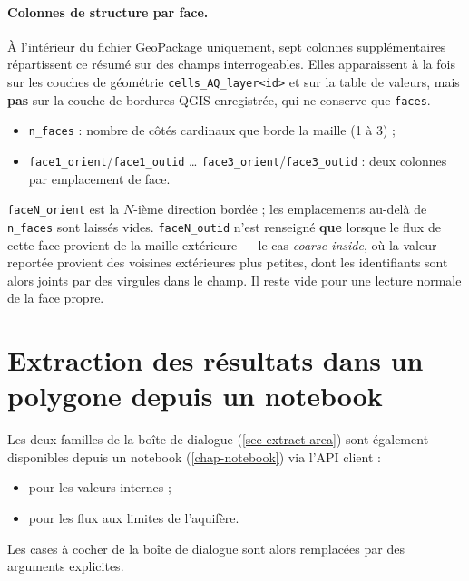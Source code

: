 \paragraph{Colonnes de structure par face.} À l'intérieur du fichier GeoPackage uniquement, sept colonnes supplémentaires répartissent ce résumé sur des champs interrogeables. Elles apparaissent à la fois sur les couches de géométrie \texttt{cells\_AQ\_layer<id>} et sur la table de valeurs, mais \textbf{pas} sur la couche de bordures QGIS enregistrée, qui ne conserve que \texttt{faces}.
\begin{itemize}
    \item \texttt{n\_faces} : nombre de côtés cardinaux que borde la maille (1 à 3) ;
    \item \texttt{face1\_orient}/\texttt{face1\_outid} \dots{} \texttt{face3\_orient}/\texttt{face3\_outid} : deux colonnes par emplacement de face.
\end{itemize}
\texttt{faceN\_orient} est la $N$-ième direction bordée ; les emplacements au-delà de \texttt{n\_faces} sont laissés vides. \texttt{faceN\_outid} n'est renseigné \textbf{que} lorsque le flux de cette face provient de la maille extérieure --- le cas \emph{coarse-inside}, où la valeur reportée provient des voisines extérieures plus petites, dont les identifiants sont alors joints par des virgules dans le champ. Il reste vide pour une lecture normale de la face propre.

\section{Extraction des résultats dans un polygone depuis un notebook}
\label{sec-extract-notebook}
Les deux familles de la boîte de dialogue  (\cref{sec-extract-area}) sont également disponibles depuis un notebook (\cref{chap-notebook}) via l'API client :
\begin{itemize}
    \item {} pour les valeurs internes ;
    \item {} pour les flux aux limites de l'aquifère.
\end{itemize}
Les cases à cocher de la boîte de dialogue sont alors remplacées par des arguments explicites.

